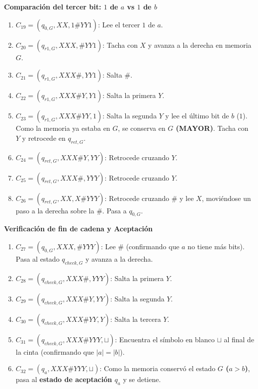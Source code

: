 \vspace{0.2cm}
\noindent\textbf{Comparación del tercer bit: $1$ de $a$ vs $1$ de $b$}
\begin{enumerate}[label=\arabic*., start=19, leftmargin=*]
    \item $C_{19} = (q_{0,G}, XX, 1\#YY1)$: Lee el tercer $1$ de $a$.
    \item $C_{20} = (q_{r1,G}, XXX, \#YY1)$: Tacha con $X$ y avanza a la derecha en memoria $G$.
    \item $C_{21} = (q_{r1,G}, XXX\#, YY1)$: Salta $\#$.
    \item $C_{22} = (q_{r1,G}, XXX\#Y, Y1)$: Salta la primera $Y$.
    \item $C_{23} = (q_{r1,G}, XXX\#YY, 1)$: Salta la segunda $Y$ y lee el último bit de $b$ ($1$). Como la memoria ya estaba en $G$, se conserva en \textbf{$G$ (MAYOR)}. Tacha con $Y$ y retrocede en $q_{ret,G}$.
    \item $C_{24} = (q_{ret,G}, XXX\#Y, YY)$: Retrocede cruzando $Y$.
    \item $C_{25} = (q_{ret,G}, XXX\#, YYY)$: Retrocede cruzando $Y$.
    \item $C_{26} = (q_{ret,G}, XX, X\#YYY)$: Retrocede cruzando $\#$ y lee $X$, moviéndose un paso a la derecha sobre la $\#$. Pasa a $q_{0,G}$.
\end{enumerate}

\vspace{0.2cm}
\noindent\textbf{Verificación de fin de cadena y Aceptación}
\begin{enumerate}[label=\arabic*., start=27, leftmargin=*]
    \item $C_{27} = (q_{0,G}, XXX, \#YYY)$: Lee $\#$ (confirmando que $a$ no tiene más bits). Pasa al estado $q_{check,G}$ y avanza a la derecha.
    \item $C_{28} = (q_{check,G}, XXX\#, YYY)$: Salta la primera $Y$.
    \item $C_{29} = (q_{check,G}, XXX\#Y, YY)$: Salta la segunda $Y$.
    \item $C_{30} = (q_{check,G}, XXX\#YY, Y)$: Salta la tercera $Y$.
    \item $C_{31} = (q_{check,G}, XXX\#YYY, \sqcup)$: Encuentra el símbolo en blanco $\sqcup$ al final de la cinta (confirmando que $|a| = |b|$).
    \item $C_{32} = (q_a, XXX\#YYY, \sqcup)$: Como la memoria conservó el estado \textbf{$G$ ($a > b$)}, pasa al \textbf{estado de aceptación $q_a$} y se detiene.
\end{enumerate}

